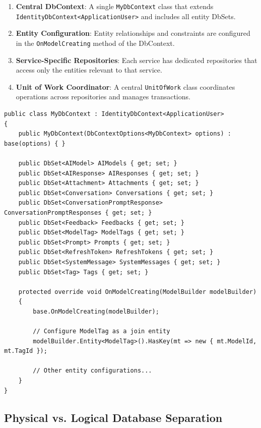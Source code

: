 \begin{enumerate}
   \item \textbf{Central DbContext}: A single \texttt{MyDbContext} class that extends \texttt{IdentityDbContext<ApplicationUser>} and includes all entity DbSets.

   \item \textbf{Entity Configuration}: Entity relationships and constraints are configured in the \texttt{OnModelCreating} method of the DbContext.

   \item \textbf{Service-Specific Repositories}: Each service has dedicated repositories that access only the entities relevant to that service.

   \item \textbf{Unit of Work Coordinator}: A central \texttt{UnitOfWork} class coordinates operations across repositories and manages transactions.
\end{enumerate}

\begin{verbatim}
public class MyDbContext : IdentityDbContext<ApplicationUser>
{
    public MyDbContext(DbContextOptions<MyDbContext> options) : base(options) { }

    public DbSet<AIModel> AIModels { get; set; }
    public DbSet<AIResponse> AIResponses { get; set; }
    public DbSet<Attachment> Attachments { get; set; }
    public DbSet<Conversation> Conversations { get; set; }
    public DbSet<ConversationPromptResponse> ConversationPromptResponses { get; set; }
    public DbSet<Feedback> Feedbacks { get; set; }
    public DbSet<ModelTag> ModelTags { get; set; }
    public DbSet<Prompt> Prompts { get; set; }
    public DbSet<RefreshToken> RefreshTokens { get; set; }
    public DbSet<SystemMessage> SystemMessages { get; set; }
    public DbSet<Tag> Tags { get; set; }

    protected override void OnModelCreating(ModelBuilder modelBuilder)
    {
        base.OnModelCreating(modelBuilder);

        // Configure ModelTag as a join entity
        modelBuilder.Entity<ModelTag>().HasKey(mt => new { mt.ModelId, mt.TagId });

        // Other entity configurations...
    }
}
\end{verbatim}

\subsection{Physical vs. Logical Database Separation}

